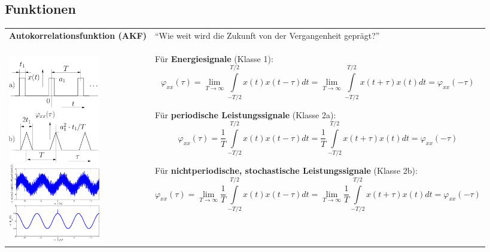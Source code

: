 \subsection{Funktionen}
\begin{tabular}{ll}
\textbf{Autokorrelationsfunktion (AKF)}
	& ``Wie weit wird die Zukunft von der Vergangenheit geprägt?'' \\
\parbox{6cm}{
	\\
	\includegraphics[width=4cm]{./bilder/akf1.png}\\
	\includegraphics[width=4cm]{./bilder/akf2.png}
	} 
	& \parbox{12cm}{
	Für \textbf{Energiesignale} (Klasse 1):
	$$\varphi_{xx}(\tau) = \lim_{T\to\infty}\int\limits_{-T/2}^{T/2}
	x(t)x(t-\tau)dt=
	\lim_{T\to\infty}\int\limits_{-T/2}^{T/2} x(t+\tau)x(t)dt =
	\varphi_{xx}(-\tau)$$
	
	Für \textbf{periodische Leistungssignale} (Klasse 2a):
	$$\varphi_{xx}(\tau) = \frac {1} {T}
	\int\limits_{-T/2}^{T/2} x(t)x(t-\tau)dt 
	= \frac {1} {T} \int\limits_{-T/2}^{T/2} x(t+\tau)x(t)dt =
	\varphi_{xx}(-\tau)$$
	
	Für \textbf{nichtperiodische, stochastische Leistungssignale} (Klasse 2b):
	$$\varphi_{xx}(\tau) = \lim_{T\rightarrow\infty} \frac {1} {T}
	\int\limits_{-T/2}^{T/2} x(t)x(t-\tau)dt=\lim_{T\rightarrow\infty}\frac {1}
	{T} \int\limits_{-T/2}^{T/2} x(t+\tau)x(t)dt = \varphi_{xx}(-\tau)$$
	
}
\end{tabular}
